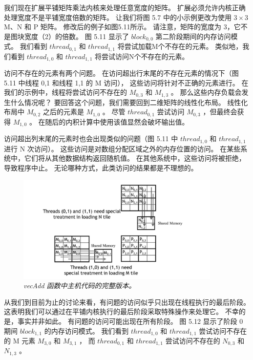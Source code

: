 我们现在扩展平铺矩阵乘法内核来处理任意宽度的矩阵。 扩展必须允许内核正确处理宽度不是平铺宽度倍数的矩阵。 
让我们将图 5.7 中的小示例更改为使用 $3 \times 3$ M、N 和 P 矩阵。 修改后的例子如图5.11所示。 
请注意，矩阵的宽度为 3，它不是图块宽度（2）的倍数。 图 5.11 显示了 $block_{0,0}$ 第二阶段期间的内存访问模式。 
我们看到 $thread_{0,1}$ 和 $thread_{1,1}$ 将尝试加载M个不存在的元素。 
类似地，我们看到 $thread_{1,0}$ 和 $thread_{1,1}$ 将尝试访问N个不存在的元素。

访问不存在的元素有两个问题。 在访问超出行末尾的不存在元素的情况下（图 5.11 中线程 0,1 和线程 1,1 的 M 访问），
这些访问将针对不正确的元素进行。 在我们的示例中，线程将尝试访问不存在的 $M_{0,3}$ 和 $M_{1,3}$ 。 
那么这些内存负载会发生什么情况呢？ 要回答这个问题，我们需要回到二维矩阵的线性化布局。 
线性化布局中 $M_{0,2}$ 之后的元素是 $M_{1,0}$ 。 
尽管 $thread_{0,1}$ 尝试访问 $M_{0,3}$ ，但最终会获得 $M_{1,0}$ 。 
在随后的内积计算中使用该值显然会破坏输出值。

访问超出列末尾的元素时也会出现类似的问题（图 5.11 中 $thread_{1,0}$ 和 $thread_{1,1}$ 进行 N 次访问）。 
这些访问是对数组分配区域之外的内存位置的访问。 在某些系统中，它们将从其他数据结构返回随机值。 
在其他系统中，这些访问将被拒绝，导致程序中止。 无论哪种方式，此类访问的结果都是不理想的。

\begin{figure}[H]
	\centering
	\includegraphics[width=0.9\textwidth]{figs/F5.12.png}
	\caption{\textit{\color{red} vecAdd 函数中主机代码的完整版本。}}
\end{figure}

从我们到目前为止的讨论来看，有问题的访问似乎只出现在线程执行的最后阶段。 
这表明我们可以通过在平铺内核执行的最后阶段采取特殊操作来处理它。 不幸的是，事实并非如此。 
有问题的访问可能出现在所有阶段。 图 5.12 显示了阶段 0 期间 $block_{1,1}$ 的内存访问模式。
我们看到 $thread_{1,0}$ 和 $thread_{1,1}$ 尝试访问不存在的 M 元素 $M_{3,0}$ 和 $M_{3,1}$ ，
而 $thread_{0,1}$ 和 $thread_{1,1}$ 尝试访问不存在的 $N_{0,3}$ 和 $N_{1,3}$ 。

